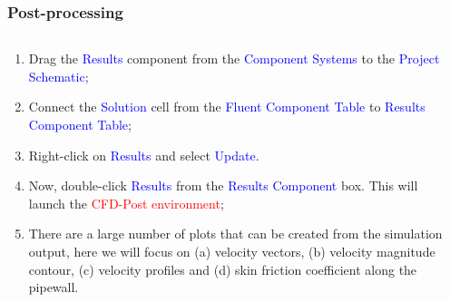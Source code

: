 \documentclass[10pt,compress, unknownkeysallowed]{beamer}
\newcommand{\red}{\textcolor{red}}
\newcommand{\blue}{\textcolor{blue}}
\begin{document}
\begin{frame}
  \frametitle{Post-processing}
    \begin{columns}
        \begin{column}[l]{0.5\linewidth}
           \begin{enumerate}\scriptsize%
                \item<1-> Drag the \blue{Results} component from the \blue{Component Systems} to the \blue{Project Schematic};
                \item<1-> Connect the \blue{Solution} cell from the \blue{Fluent Component Table} to \blue{Results Component Table};
                \item<1-> Right-click on \blue{Results} and select \blue{Update}.
                \item<1-> Now, double-click \blue{Results} from the \blue{Results Component} box. This will launch the \red{CFD-Post environment};
                \item<2-> There are a large number of plots that can be created from the simulation output, here we will focus on (a) velocity vectors, (b) velocity magnitude contour, (c) velocity profiles and (d) skin friction coefficient along the pipewall.                 
           \end{enumerate}
        \end{column}
           \begin{column}[l]{0.5\linewidth}
           \end{column}
    \end{columns}
\end{frame}
\end{document}
